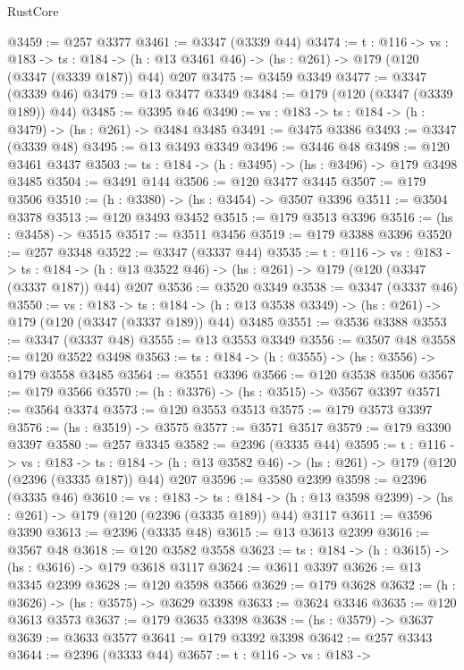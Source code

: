\begin{lexlean}{RustCore}
\begin{coremodule}
@3459 := @257 @3377
@3461 := @3347 (@3339 @44)
@3474 := {t : @116} ->
  {vs : @183} ->
  {ts : @184} -> (h : @13 @3461 @46) -> (hs : @261) -> @179 (@120 (@3347 (@3339 @187)) @44) @207
@3475 := @3459 @3349
@3477 := @3347 (@3339 @46)
@3479 := @13 @3477 @3349
@3484 := @179 (@120 (@3347 (@3339 @189)) @44)
@3485 := @3395 @46
@3490 := {vs : @183} -> {ts : @184} -> (h : @3479) -> (hs : @261) -> @3484 @3485
@3491 := @3475 @3386
@3493 := @3347 (@3339 @48)
@3495 := @13 @3493 @3349
@3496 := @3446 @48
@3498 := @120 @3461 @3437
@3503 := {ts : @184} -> (h : @3495) -> (hs : @3496) -> @179 @3498 @3485
@3504 := @3491 @144
@3506 := @120 @3477 @3445
@3507 := @179 @3506
@3510 := (h : @3380) -> (hs : @3454) -> @3507 @3396
@3511 := @3504 @3378
@3513 := @120 @3493 @3452
@3515 := @179 @3513 @3396
@3516 := (hs : @3458) -> @3515
@3517 := @3511 @3456
@3519 := @179 @3388 @3396
@3520 := @257 @3348
@3522 := @3347 (@3337 @44)
@3535 := {t : @116} ->
  {vs : @183} ->
  {ts : @184} -> (h : @13 @3522 @46) -> (hs : @261) -> @179 (@120 (@3347 (@3337 @187)) @44) @207
@3536 := @3520 @3349
@3538 := @3347 (@3337 @46)
@3550 := {vs : @183} ->
  {ts : @184} -> (h : @13 @3538 @3349) -> (hs : @261) -> @179 (@120 (@3347 (@3337 @189)) @44) @3485
@3551 := @3536 @3388
@3553 := @3347 (@3337 @48)
@3555 := @13 @3553 @3349
@3556 := @3507 @48
@3558 := @120 @3522 @3498
@3563 := {ts : @184} -> (h : @3555) -> (hs : @3556) -> @179 @3558 @3485
@3564 := @3551 @3396
@3566 := @120 @3538 @3506
@3567 := @179 @3566
@3570 := (h : @3376) -> (hs : @3515) -> @3567 @3397
@3571 := @3564 @3374
@3573 := @120 @3553 @3513
@3575 := @179 @3573 @3397
@3576 := (hs : @3519) -> @3575
@3577 := @3571 @3517
@3579 := @179 @3390 @3397
@3580 := @257 @3345
@3582 := @2396 (@3335 @44)
@3595 := {t : @116} ->
  {vs : @183} ->
  {ts : @184} -> (h : @13 @3582 @46) -> (hs : @261) -> @179 (@120 (@2396 (@3335 @187)) @44) @207
@3596 := @3580 @2399
@3598 := @2396 (@3335 @46)
@3610 := {vs : @183} ->
  {ts : @184} -> (h : @13 @3598 @2399) -> (hs : @261) -> @179 (@120 (@2396 (@3335 @189)) @44) @3117
@3611 := @3596 @3390
@3613 := @2396 (@3335 @48)
@3615 := @13 @3613 @2399
@3616 := @3567 @48
@3618 := @120 @3582 @3558
@3623 := {ts : @184} -> (h : @3615) -> (hs : @3616) -> @179 @3618 @3117
@3624 := @3611 @3397
@3626 := @13 @3345 @2399
@3628 := @120 @3598 @3566
@3629 := @179 @3628
@3632 := (h : @3626) -> (hs : @3575) -> @3629 @3398
@3633 := @3624 @3346
@3635 := @120 @3613 @3573
@3637 := @179 @3635 @3398
@3638 := (hs : @3579) -> @3637
@3639 := @3633 @3577
@3641 := @179 @3392 @3398
@3642 := @257 @3343
@3644 := @2396 (@3333 @44)
@3657 := {t : @116} ->
  {vs : @183} ->

\end{coremodule}
\end{lexlean}
